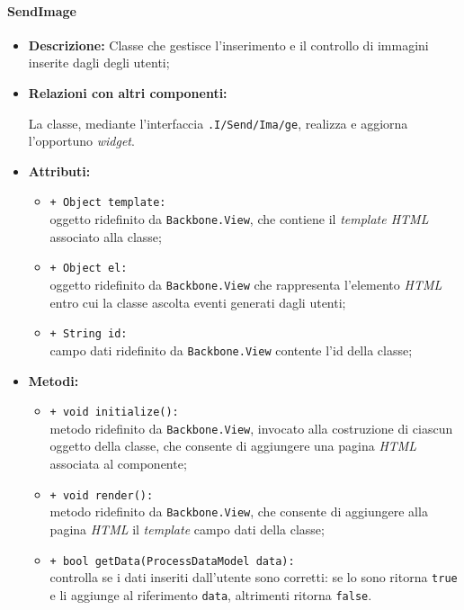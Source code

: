 \paragraph{SendImage}
\label{sendImage}
\begin{flushleft}
\begin{itemize}
\item \textbf{Descrizione:} Classe che gestisce l'inserimento e il controllo di immagini inserite dagli degli utenti;
\item \textbf{Relazioni con altri componenti:}
\begin{sloppypar}
La classe, mediante l'interfaccia \texttt{\viewUser{}.I\fshyp{}Send\fshyp{}Ima\fshyp{}ge}, realizza e aggiorna l'opportuno \textit{widget}.
\end{sloppypar}
\item \textbf{Attributi:}
\begin{sloppypar}
\begin{itemize}
\item \texttt{+ Object template:}\\ oggetto ridefinito da \texttt{Backbone.View}, che contiene il \textit{template HTML} associato alla classe;
\item \texttt{+ Object el:}\\ oggetto ridefinito da \texttt{Backbone.View} che rappresenta l'elemento \textit{HTML} entro cui la classe ascolta eventi generati dagli utenti;
\item \texttt{+ String id:}\\ campo dati ridefinito da \texttt{Backbone.View} contente l'id della classe;
\end{itemize}
\end{sloppypar}
\item \textbf{Metodi:}
\begin{sloppypar}
\begin{itemize}
\item \texttt{+ void initialize():}\\ metodo ridefinito da \texttt{Backbone.View}, invocato alla costruzione di ciascun oggetto della classe, che consente di aggiungere una pagina \textit{HTML} associata al componente;
\item \texttt{+ void render():}\\ metodo ridefinito da \texttt{Backbone.View}, che consente di aggiungere alla pagina \textit{HTML} il \textit{template} campo dati della classe;
\item \texttt{+ bool getData(ProcessDataModel data):}\\ controlla se i dati inseriti dall'utente sono corretti: se lo sono ritorna \texttt{true} e li aggiunge al riferimento \texttt{data}, altrimenti ritorna \texttt{false}.
\end{itemize}
\end{sloppypar}
\end{itemize}
\end{flushleft}


